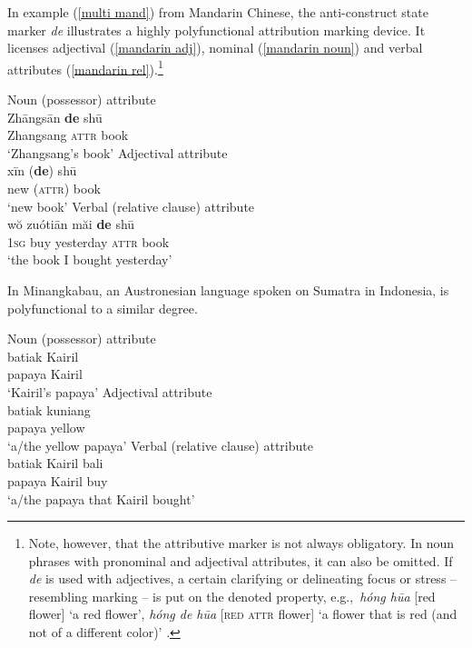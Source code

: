 In example (\ref{multi mand}) from Mandarin Chinese, the anti\hyp{}construct state marker \textit{de} illustrates a highly polyfunctional attribution marking device. It licenses adjectival (\ref{mandarin adj}), nominal (\ref{mandarin noun}) and verbal attributes (\ref{mandarin rel}).\footnote{Note, however, that the attributive marker is not always obligatory. In noun phrases with pronominal and adjectival attributes, it can also be omitted. If \textit{de} is used with adjectives, a certain clarifying or delineating focus or stress – resembling  marking – is put on the denoted property, e.g.,~\textit{hóng hūa} [red flower] ‘a red flower’, \textit{hóng de hūa} [\textsc{red} \textsc{attr} flower] ‘a flower that is red (and not of a different color)’ \citep[119–123]{li-etal1981}.}
\begin{exe}
\ex
{}
\label{multi mand}
\begin{xlist}
\ex	\rm{Noun (possessor) attribute}\\
\gll	Zhāngsān 	\textbf{de} 	shū\\
	Zhangsang 	{\textsc{attr}} 	book\\
\glt	‘Zhangsang's book’\label{mandarin noun}
\ex	\rm{Adjectival attribute}\\
\gll	xīn 		(\textbf{de}) 	shū\\
	new	 	({\textsc{attr}}) 	book\\
\glt	‘new book’\label{mandarin adj}
\ex	\rm{Verbal (relative clause) attribute}\\
\gll	wŏ zuótiān 	măi 	\textbf{de} 	shū\\
	\textsc{1sg} 	buy	yesterday 	{\textsc{attr}} 	book\\
\glt	‘the book I bought yesterday’\label{mandarin rel}
\end{xlist}
\end{exe}
In Minangkabau, an Austronesian language spoken on Sumatra in Indonesia,  is polyfunctional to a similar degree.
\begin{exe}
\ex 
{} \label{multi minangkabau}
\begin{xlist}
\ex \rm{Noun (possessor) attribute}\\
\gll	batiak Kairil\\
	papaya Kairil\\
\glt	‘Kairil's papaya’
\ex \rm{Adjectival attribute}\\
\gll	batiak kuniang\\
	papaya yellow\\
\glt	‘a/the yellow papaya’
\ex \rm{Verbal (relative clause) attribute}\\
\gll	batiak Kairil bali\\
	papaya Kairil buy\\
\glt	‘a/the papaya that Kairil bought’
\end{xlist}
\end{exe}
